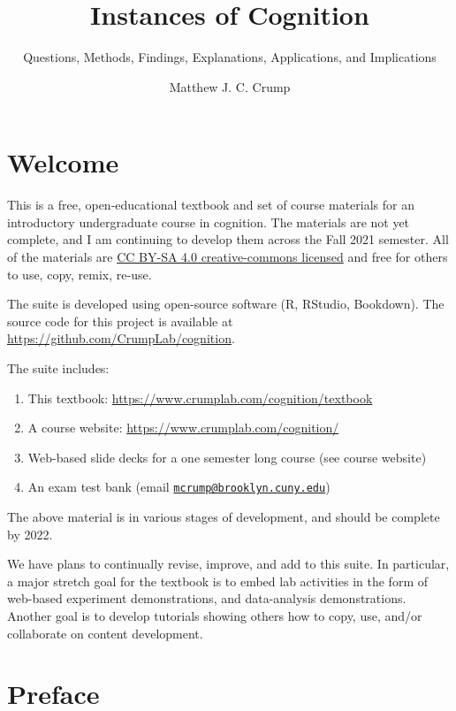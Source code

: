 \documentclass[
  oneside,
  12pt]{crumpbook}
\title{Instances of Cognition}
\subtitle{Questions, Methods, Findings, Explanations, Applications, and Implications}
\author{Matthew J. C. Crump}
\date{}
\providecommand{\tightlist}{%
  \setlength{\itemsep}{0pt}\setlength{\parskip}{0pt}}
\begin{document}
\maketitle

{
\setcounter{tocdepth}{1}
\tableofcontents
}
\hypertarget{welcome}{%
\chapter*{Welcome}\label{welcome}}

This is a free, open-educational textbook and set of course materials for an introductory undergraduate course in cognition. The materials are not yet complete, and I am continuing to develop them across the Fall 2021 semester. All of the materials are \href{https://creativecommons.org/licenses/by-sa/4.0/}{CC BY-SA 4.0 creative-commons licensed} and free for others to use, copy, remix, re-use.

The suite is developed using open-source software (R, RStudio, Bookdown). The source code for this project is available at \url{https://github.com/CrumpLab/cognition}.

The suite includes:

\begin{enumerate}
\def\labelenumi{\arabic{enumi}.}
\tightlist
\item
  This textbook: \url{https://www.crumplab.com/cognition/textbook}
\item
  A course website: \url{https://www.crumplab.com/cognition/}
\item
  Web-based slide decks for a one semester long course (see course website)
\item
  An exam test bank (email \href{mailto:mcrump@brooklyn.cuny.edu}{\nolinkurl{mcrump@brooklyn.cuny.edu}})
\end{enumerate}

The above material is in various stages of development, and should be complete by 2022.

We have plans to continually revise, improve, and add to this suite. In particular, a major stretch goal for the textbook is to embed lab activities in the form of web-based experiment demonstrations, and data-analysis demonstrations. Another goal is to develop tutorials showing others how to copy, use, and/or collaborate on content development.

\hypertarget{preface}{%
\chapter*{Preface}\label{preface}}
\end{document}
